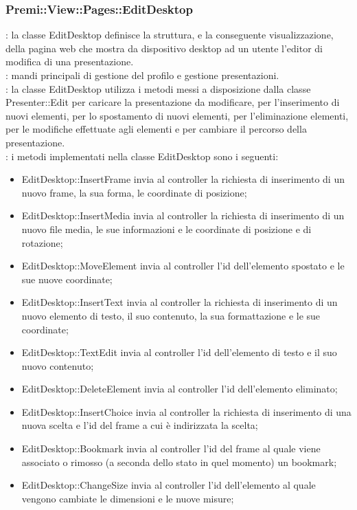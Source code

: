 {		\subsubsection{Premi::View::Pages::EditDesktop}{
			\textbf{\tipo}: la classe EditDesktop definisce la struttura, e la conseguente visualizzazione, della pagina web che mostra da dispositivo desktop ad un utente  l'editor di modifica di una presentazione.\\
			\textbf{\relaz}: mandi principali di gestione del profilo e gestione presentazioni.\\	
			\textbf{\relaz}: la classe EditDesktop utilizza i metodi messi a disposizione dalla classe Presenter::Edit per caricare la presentazione da modificare, per l'inserimento di nuovi elementi, per lo spostamento di nuovi elementi, per l'eliminazione elementi, per le modifiche  effettuate agli elementi e per cambiare il percorso della presentazione.\\
			\textbf{\interfacce}: i metodi implementati nella classe EditDesktop sono i seguenti:
			\begin{itemize}
				\item EditDesktop::InsertFrame invia al controller la richiesta di inserimento di un nuovo frame, la sua forma, le coordinate di posizione;
				\item EditDesktop::InsertMedia invia al controller la richiesta di inserimento di un nuovo file media, le sue informazioni e le coordinate di posizione e di rotazione;
				\item EditDesktop::MoveElement invia al controller l'id dell'elemento spostato e le sue nuove coordinate;
				\item EditDesktop::InsertText invia al controller la richiesta di inserimento di un nuovo elemento di testo, il suo contenuto, la sua formattazione e le sue coordinate;
				\item EditDesktop::TextEdit invia al controller l'id dell'elemento di testo e il suo nuovo contenuto;
				\item EditDesktop::DeleteElement invia al controller l'id dell'elemento eliminato;
				\item EditDesktop::InsertChoice invia al controller la richiesta di inserimento di una nuova scelta e l'id del frame a cui è indirizzata la scelta;
				\item EditDesktop::Bookmark invia al controller l'id del frame al quale viene associato o rimosso (a seconda dello stato in quel momento) un bookmark;
				\item EditDesktop::ChangeSize invia al controller l'id dell'elemento al quale vengono cambiate le dimensioni e le nuove misure;

\end{itemize}}}
